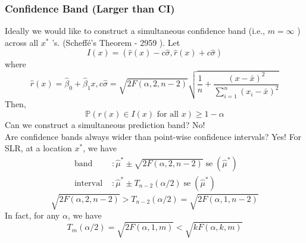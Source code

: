 \documentclass[11pt,a4paper]{article}
\begin{document}
\subsubsection{Conﬁdence Band (Larger than CI)}
Ideally we would like to construct a simultaneous confidence band (i.e., $m=\infty$ ) across all $x^{*}$ 's. (Scheffé's Theorem - 2959 ). Let
$$
I(x)=(\hat{r}(x)-c \hat{\sigma}, \hat{r}(x)+c \hat{\sigma})
$$
where
$$
\hat{r}(x)=\hat{\beta}_{0}+\hat{\beta}_{1} x, c \hat{\sigma}=\sqrt{2 F(\alpha, 2, n-2)} \sqrt{\frac{1}{n}+\frac{(x-\bar{x})^{2}}{\sum_{i=1}^{n}\left(x_{i}-\bar{x}\right)^{2}}}
$$
Then,
$$
\mathbb{P}(r(x) \in I(x) \text { for all } x) \geq 1-\alpha
$$
Can we construct a simultaneous prediction band? No!\\
Are confidence bands always wider than point-wise confidence intervals? Yes!
For SLR, at a location $x^{*}$, we have
$$
\begin{aligned}
\text { band } &: \hat{\mu}^{*} \pm \sqrt{2 F(\alpha, 2, n-2)} \operatorname{se}\left(\hat{\mu}^{*}\right) \\
\text { interval } &: \hat{\mu}^{*} \pm T_{n-2}(\alpha / 2) \operatorname{se}\left(\hat{\mu}^{*}\right)
\end{aligned}
$$
$$
\sqrt{2 F(\alpha, 2, n-2)} > T_{n-2}(\alpha / 2)=\sqrt{2 F(\alpha, 1, n-2)}
$$
In fact, for any $\alpha$, we have
$$
T_{m}(\alpha / 2)=\sqrt{2F(\alpha, 1, m)}<\sqrt{k F(\alpha, k, m)}
$$
\end{document}
